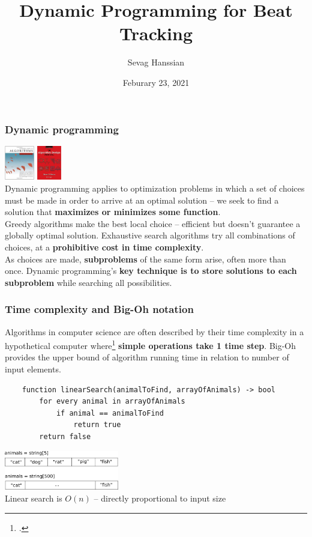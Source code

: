 \documentclass{beamer}
\title{Dynamic Programming for Beat Tracking}
\author{Sevag Hanssian}
\date{Feburary 23, 2021}
\institute{MUMT 621, Winter 2021}
\begin{document}
\begin{frame}
\maketitle
\end{frame}

\begin{frame}
	\frametitle{Dynamic programming}
	\vspace{0.5em}
	\includegraphics[height=1.5cm]{./clrs.jpg} \includegraphics[height=1.5cm]{./skiena.jpg}\\
	Dynamic programming applies to optimization problems in which a set of choices must be made in order to arrive at an optimal solution -- we seek to find a solution that \textbf{maximizes or minimizes some function}.\\
	\vspace{0.25em}
	Greedy algorithms make the best local choice -- efficient but doesn't guarantee a globally optimal solution. Exhaustive search algorithms try all combinations of choices, at a \textbf{prohibitive cost in time complexity}.\\
	\vspace{0.25em}
	As choices are made, \textbf{subproblems} of the same form arise, often more than once. Dynamic programming's \textbf{key technique is to store solutions to each subproblem} while searching all possibilities.
\end{frame}

\begin{frame}[fragile]
	\frametitle{Time complexity and Big-Oh notation}
	Algorithms in computer science are often described by their time complexity in a hypothetical computer where\footcite{skiena} \textbf{simple operations take 1 time step}. Big-Oh provides the upper bound of algorithm running time in relation to number of input elements.
	\begin{verbatim}
	function linearSearch(animalToFind, arrayOfAnimals) -> bool
	    for every animal in arrayOfAnimals
	        if animal == animalToFind
	            return true
	    return false
	\end{verbatim}
	\includegraphics[width=5cm]{./linearsearch.png}\\
	Linear search is $O(n)$ -- directly proportional to input size
\end{frame}
\end{document}
